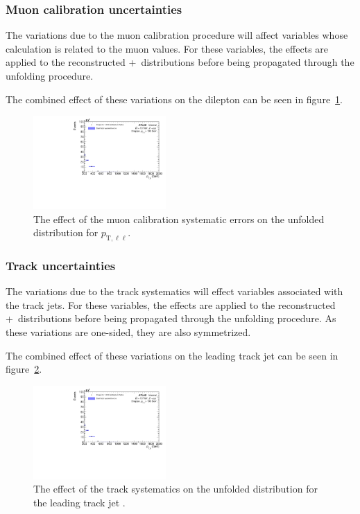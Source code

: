 \subsubsection{Muon calibration uncertainties}
The variations due to the muon calibration procedure will affect variables whose calculation is related to the muon \pt values. For these variables, the effects are applied to the reconstructed \powheg+\pythia~distributions before being propagated through the unfolding procedure.

The combined effect of these variations on the dilepton \pt can be seen in figure~\ref{fig:muCalSystErr}.

\begin{figure}[h!]
  \centering
  \includegraphics[page=25,width=0.45\textwidth]{figures/unfoldErrPlots.pdf}
  \caption{The effect of the muon calibration systematic errors on the unfolded distribution for $p_{\text{T},\ell\ell}$.}
  \label{fig:muCalSystErr}
\end{figure}

\subsubsection{Track uncertainties}
The variations due to the track systematics will effect variables associated with the track jets. For these variables, the effects are applied to the reconstructed \powheg+\pythia~distributions before being propagated through the unfolding procedure. As these variations are one-sided, they are also symmetrized.

The combined effect of these variations on the leading track jet \pt can be seen in figure~\ref{fig:trackSystErr}.

\begin{figure}[h!]
  \centering
  \includegraphics[page=261,width=0.45\textwidth]{figures/unfoldErrPlots.pdf}
  \caption{The effect of the track systematics on the unfolded distribution for the leading track jet \pt.}
  \label{fig:trackSystErr}
\end{figure}

